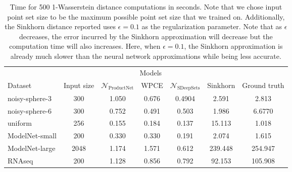 \documentclass[12pt]{article}
\newcommand{\Network}{\mathcal{N}_{\mathrm{ProductNet}}}
\begin{document}
\begin{table}[t]
    \centering
    \caption{Time for 500 1-Wasserstein distance computations in seconds. Note that we chose input point set size to be the maximum possible point set size that we trained on. Additionally, the Sinkhorn distance reported uses $\epsilon = 0.1$ as the regularization parameter. Note that as $\epsilon$ decreases, the error incurred by  the Sinkhorn approximation will decrease but the computation time will also increases. Here, when $\epsilon = 0.1$, the Sinkhorn approximation is already much slower than the neural network approximations while being less accurate.}
    
    \begin{tabular}{lcccccc}
          \toprule
           & & \multicolumn{3}{c}{Models}\\
    \cmidrule(r){3-5}
          Dataset & Input size & $\Network$ & WPCE & $\mathcal{N}_{\mathrm{SDeepSets}}$ & Sinkhorn  & Ground truth \\
          \midrule
          noisy-sphere-3       & 300  & 1.050 & 0.676 & 0.4904 & 2.591 & 2.813\\
          noisy-sphere-6     & 300  & 0.752 & 0.491 & 0.503 & 1.986 & 6.6770 \\
          uniform             & 256  & 0.155 & 0.184 & 0.137 & 15.113 & 1.018\\
          ModelNet-small            & 200  & 0.330 & 0.330 & 0.191 & 2.074 & 1.615 \\
          ModelNet-large      & 2048 & 1.174 & 1.571 & 0.612 & 239.448 &  254.947 \\
          RNAseq & 200 & 1.128 & 0.856 & 0.792   & 92.153 & 105.908 \\
         \bottomrule
    \end{tabular}
    \label{tab:computation-time}
\end{table}
\end{document}
